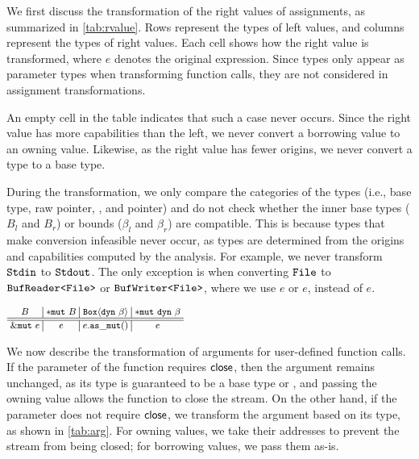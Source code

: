 We first discuss the transformation of the right values of assignments, as
summarized in \cref{tab:rvalue}.
%
Rows represent the types of left values, and columns represent the types of
right values.
%
Each cell shows how the right value is transformed, where $e$ denotes the
original expression.
%
Since  types only appear as parameter types when transforming function
calls, they are not considered in assignment transformations.

An empty cell in the table indicates that such a case never occurs.
%
Since the right value has more capabilities than the left, we never convert a
borrowing value to an owning value.
%
Likewise, as the right value has fewer origins, we never convert a  type
to a base type.

During the transformation, we only compare the categories of the types (i.e.,
base type, raw pointer, , and  pointer) and do not check
whether the inner base types ($B_l$ and $B_r$) or bounds ($\beta_l$ and
$\beta_r$) are compatible.
%
This is because types that make conversion infeasible never occur, as types are
determined from the origins and capabilities computed by the analysis.
%
For example, we never transform {\small${\tt Stdin}$} to {\small${\tt Stdout}$}.
%
The only exception is when converting {\small${\tt File}$} to {\small${\tt BufReader\texttt{<}File\texttt{>}}$}
or {\small${\tt BufWriter\texttt{<}File\texttt{>}}$}, where we use $e$\C{)} or
$e$\C{)}, instead of $e$.

\begin{table}[t]
  \caption{Transformation of arguments according to types}
  \label{tab:arg}
  \vspace{-1em}
  \centering
  $\footnotesize
  \begin{array}{@{~}c@{~}|@{~}c@{~}|@{~}c@{~}|@{~}c@{~}}
    B & \tptr{B} & \tbox{\beta} & \tdynptr{\beta} \\ \hline\hline
    {\tt\&mut\ }e & e & e.{\tt as\_mut}() & e \\
  \end{array}$
  \vspace{-1.5em}
\end{table}

We now describe the transformation of arguments for user-defined function calls.
%
If the parameter of the function requires ${\sf close}$, then the argument remains
unchanged, as its type is guaranteed to be a base type or , and passing
the owning value allows the function to close the stream.
%
On the other hand, if the parameter does not require ${\sf close}$, we transform the
argument based on its type, as shown in \cref{tab:arg}.
%
For owning values, we take their addresses to prevent the stream from being
closed;
%
for borrowing values, we pass them as-is.


